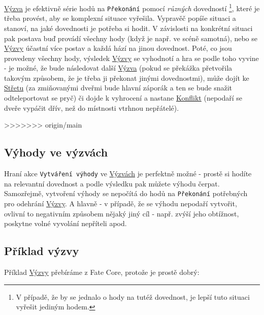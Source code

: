 \documentclass[../main.tex]{subfiles}
\begin{document}
\underline{Výzva} je efektivně série hodů na \texttt{Překonání} pomocí \textit{různých} dovedností \footnote{V případě, že by se jednalo o hody na tutéž dovednost, je lepší tuto situaci vyřešit jediným hodem.}, které je třeba provést, aby se komplexní situace vyřešila. Vypravěč popíše situaci a stanoví, na jaké dovednosti je potřeba si hodit. V závislosti na konkrétní situaci pak postava buď provádí všechny hody (když je např. ve scéně samotná), nebo se \underline{Výzvy} účastní více postav a každá hází na jinou dovednost. Poté, co jsou provedeny všechny hody, výsledek \underline{Výzvy} se vyhodnotí a hra se podle toho vyvine - je možné, že bude následovat další \underline{Výzva} (pokud se překážka přetvořila takovým způsobem, že je třeba ji překonat jinými dovednostmi), může dojít ke \underline{Střetu} (za zmiňovanými dveřmi bude hlavní záporák a ten se bude snažit odteleportovat se pryč) či dojde k vyhrocení a nastane \underline{Konflikt} (nepodaří se dveře vypáčit dřív, než do místnosti vtrhnou nepřátelé).

>>>>>>> origin/main
\subsection{Výhody ve výzvách}
\label{sec:výhody-výzvy}

Hraní akce \texttt{Vytváření výhody} ve \underline{Výzvách} je perfektně možné - prostě si hodíte na relevantní dovednost a podle výsledku pak můžete výhodu čerpat. Samozřejmě, vytvoření výhody se nepočítá do hodů na \texttt{Překonání} potřebných pro odehrání \underline{Výzvy}. A hlavně - v případě, že se výhodu nepodaří vytvořit, ovlivní to negativním způsobem nějaký jiný cíl - např. zvýší jeho obtížnost, poskytne volné vyvolání nepříteli apod.

\subsection{Příklad výzvy}
\label{sec:příklad-výzvy}

Příklad \underline{Výzvy} přebíráme z Fate Core, protože je prostě dobrý:
\end{document}
